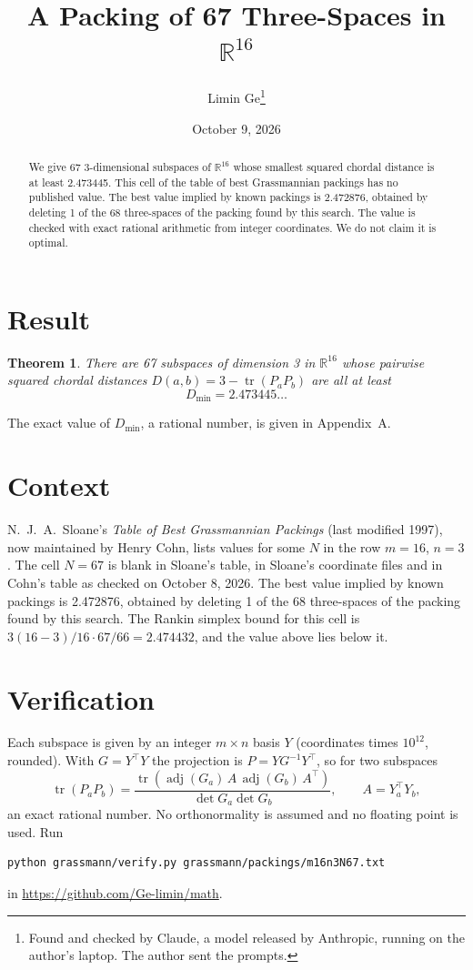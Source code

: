 \documentclass[11pt,a4paper]{article}
\title{A Packing of 67 Three-Spaces in $\mathbb{R}^{16}$}
\author{Limin Ge\thanks{Found and checked by Claude, a model released by Anthropic, running on the author's laptop. The author sent the prompts.}}
\date{October 9, 2026}
\newtheorem*{theorem}{Theorem}
\begin{document}
\maketitle
\begin{abstract}
We give 67 3-dimensional subspaces of $\mathbb{R}^{16}$ whose smallest squared chordal distance is at least 2.473445. This cell of the table of best Grassmannian packings has no published value. The best value implied by known packings is 2.472876, obtained by deleting 1 of the 68 three-spaces of the packing found by this search. The value is checked with exact rational arithmetic from integer coordinates. We do not claim it is optimal.
\end{abstract}

\section{Result}
\begin{theorem}
There are 67 subspaces of dimension 3 in $\mathbb{R}^{16}$ whose pairwise squared chordal distances $D(a,b) = 3 - \operatorname{tr}(P_aP_b)$ are all at least
\[ D_{\min} = 2.473445\ldots \]
\end{theorem}
The exact value of $D_{\min}$, a rational number, is given in Appendix~A.


\section{Context}
N.~J.~A.~Sloane's \emph{Table of Best Grassmannian Packings} (last modified 1997), now maintained by Henry Cohn, lists values for some $N$ in the row $m=16$, $n=3$. The cell $N=67$ is blank in Sloane's table, in Sloane's coordinate files and in Cohn's table as checked on October 8, 2026. The best value implied by known packings is 2.472876, obtained by deleting 1 of the 68 three-spaces of the packing found by this search. The Rankin simplex bound for this cell is $3(16-3)/16\cdot 67/66 = 2.474432$, and the value above lies below it.


\section{Verification}
Each subspace is given by an integer $m\times n$ basis $Y$ (coordinates times $10^{12}$, rounded). With $G=Y^\top Y$ the projection is $P=YG^{-1}Y^\top$, so for two subspaces
\[ \operatorname{tr}(P_aP_b)=\frac{\operatorname{tr}(\operatorname{adj}(G_a)\,A\,\operatorname{adj}(G_b)\,A^\top)}{\det G_a\det G_b},\qquad A=Y_a^\top Y_b, \]
an exact rational number. No orthonormality is assumed and no floating point is used. Run
\begin{verbatim}
python grassmann/verify.py grassmann/packings/m16n3N67.txt
\end{verbatim}
in \url{https://github.com/Ge-limin/math}.
\end{document}
